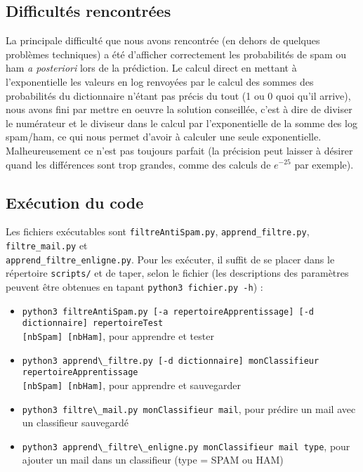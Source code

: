 \documentclass{report}
\begin{document}
\subsection*{Difficultés rencontrées}

La principale difficulté que nous avons rencontrée (en dehors de quelques problèmes techniques) a été d'afficher correctement les probabilités de spam ou ham \textit{a posteriori} lors de la prédiction. Le calcul direct en mettant à l'exponentielle les valeurs en log renvoyées par le calcul des sommes des probabilités du dictionnaire n'étant pas précis du tout (1 ou 0 quoi qu'il arrive), nous avons fini par mettre en oeuvre la solution conseillée, c'est à dire de diviser le numérateur et le diviseur dans le calcul par l'exponentielle de la somme des log spam/ham, ce qui nous permet d'avoir à calculer une seule exponentielle. Malheureusement ce n'est pas toujours parfait (la précision peut laisser à désirer quand les différences sont trop grandes, comme des calculs de $e^{-25}$ par exemple).

\subsection*{Exécution du code}

Les fichiers exécutables sont \verb|filtreAntiSpam.py|, \verb|apprend_filtre.py|, \verb|filtre_mail.py| et \\\verb|apprend_filtre_enligne.py|. Pour les exécuter, il suffit de se placer dans le répertoire \verb|scripts/| et de taper, selon le fichier (les descriptions des paramètres peuvent être obtenues en tapant \verb|python3 fichier.py -h|) : 
\begin{itemize}
\item \verb|python3 filtreAntiSpam.py [-a repertoireApprentissage] [-d dictionnaire] repertoireTest|\\\verb|[nbSpam] [nbHam]|, pour apprendre et tester
\item \verb|python3 apprend\_filtre.py [-d dictionnaire] monClassifieur repertoireApprentissage| \\\verb|[nbSpam] [nbHam]|, pour apprendre et sauvegarder
\item \verb|python3 filtre\_mail.py monClassifieur mail|, pour prédire un mail avec un classifieur sauvegardé
\item \verb|python3 apprend\_filtre\_enligne.py monClassifieur mail type|, pour ajouter un mail dans un classifieur (type = SPAM ou HAM)
\end{itemize}
\end{document}
